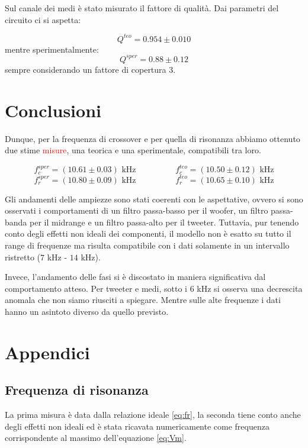 \documentclass[12pt,italian]{article}
\newcommand{\err}[1]{\textcolor{red}{#1}}
\begin{document}
Sul canale dei medi è stato misurato il fattore di qualità. Dai parametri del
circuito ci si aspetta:

\begin{equation*}
	Q^{teo} = 0.954 \pm 0.010
\end{equation*}
mentre sperimentalmente:
\begin{equation*}
	Q^{sper} = 0.88 \pm 0.12
\end{equation*}
sempre considerando un fattore di copertura $3$.

\section*{Conclusioni}

Dunque, per la frequenza di crossover e per quella di risonanza abbiamo
ottenuto due stime \err{misure}, una teorica e una sperimentale, compatibili
tra loro.

\begin{equation*}
	f_{c}^{sper} = (10.61 \pm 0.03) \text{ kHz} \hspace{2cm}
	f_{c}^{teo} = (10.50 \pm 0.12) \text{ kHz}
\end{equation*}
\begin{equation*}
	f_{r}^{sper} = (10.80 \pm 0.09) \text{ kHz}
	\hspace{2cm} f_{r}^{teo} = (10.65 \pm 0.10) \text{ kHz}
\end{equation*}

Gli andamenti delle ampiezze sono stati coerenti con le aspettative, ovvero si
sono osservati i comportamenti di un filtro passa-basso per il woofer, un
filtro passa-banda per il midrange e un filtro passa-alto per il tweeter.
Tuttavia, pur tenendo conto degli effetti non ideali dei componenti, il modello
non è esatto su tutto il range di frequenze ma risulta compatibile con i dati
solamente in un intervallo ristretto ($7$ kHz - $14$ kHz).

Invece, l'andamento delle fasi si è discostato in maniera significativa dal
comportamento atteso. Per tweeter e medi, sotto i $6$ kHz si osserva una
decrescita anomala che non siamo riusciti a spiegare. Mentre sulle alte
frequenze i dati hanno un asintoto diverso da quello previsto.

\appendix
\section{Appendici}
\subsection{Frequenza di risonanza}\label{sec:resFreq}
La prima misura è data dalla relazione ideale \eqref{eq:fr}, la seconda tiene
conto anche degli effetti non ideali ed è stata ricavata numericamente come
frequenza corrispondente al massimo dell'equazione \eqref{eq:Vm}.
\end{document}
